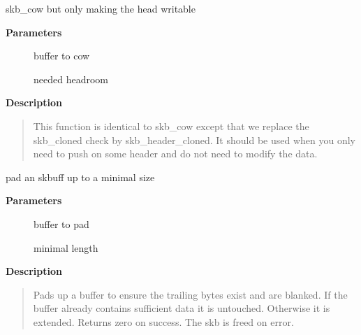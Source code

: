 \documentclass[a4paper,8pt,english]{sphinxmanual}
\begin{document}
\begin{fulllineitems}
\label{networking/kapi:c.skb_cow_head}
skb\_cow but only making the head writable

\end{fulllineitems}


\textbf{Parameters}
\begin{description}
\item[{}] \leavevmode
buffer to cow

\item[{}] \leavevmode
needed headroom

\end{description}

\textbf{Description}
\begin{quote}

This function is identical to skb\_cow except that we replace the
skb\_cloned check by skb\_header\_cloned.  It should be used when
you only need to push on some header and do not need to modify
the data.
\end{quote}

\begin{fulllineitems}
\label{networking/kapi:c.skb_padto}
pad an skbuff up to a minimal size

\end{fulllineitems}


\textbf{Parameters}
\begin{description}
\item[{}] \leavevmode
buffer to pad

\item[{}] \leavevmode
minimal length

\end{description}

\textbf{Description}
\begin{quote}

Pads up a buffer to ensure the trailing bytes exist and are
blanked. If the buffer already contains sufficient data it
is untouched. Otherwise it is extended. Returns zero on
success. The skb is freed on error.
\end{quote}
\end{document}
